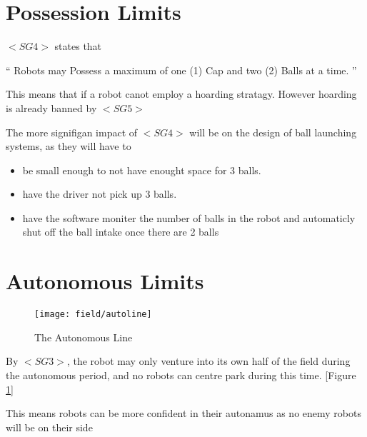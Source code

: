 \documentclass[../../main.tex]{subfiles}
\begin{document}
\section{Possession Limits}

$<SG4>$ states that

`` Robots may Possess a maximum of one (1) Cap 
and two (2) Balls at a time. ''
\par

This means that if a robot canot employ a hoarding stratagy.
However hoarding is already banned by $<SG5>$ \par

The more signifigan impact of $<SG4>$ will be on the design of
ball launching systems, as they will have to

\begin{itemize}
    \item be small enough to not have enought space for 3 balls.
    \item have the driver not pick up 3 balls.
    \item have the software moniter the number of balls in the robot
          and automaticly shut off the ball intake once there are 2 balls
\end{itemize}

\section{Autonomous Limits}

\begin{figure}
    \centering    
    \texttt{[image: field/autoline]}
    \caption{The Autonomous Line}
    \label{fig:autoline}
\end{figure}

By $<SG3>$, the robot may only venture into its own half of the field during the
autonomous period, and no robots can centre park during this time. [Figure \ref{fig:autoline}]
\par

This means robots can be more confident in their autonamus as no enemy robots will be on their
side
\end{document}
